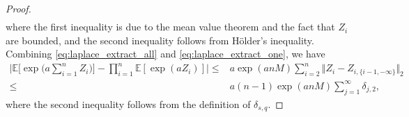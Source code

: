 \documentclass[11pt]{article}
\theoremstyle{plain}
\theoremstyle{definition}
\begin{document}
\begin{proof}
\begin{align}
\end{align} 
where the first inequality is due to the mean value theorem and the fact that $Z_i$ are bounded, and the second inequality follows from H\"older's inequality.
Combining \eqref{eq:laplace_extract_all} and \eqref{eq:laplace_extract_one}, we have
\begin{equation*}
\begin{aligned}
    \bigg|\mathbb{E}\Big[\exp\Big(a\sum_{i = 1}^n Z_i \Big) \Big] - \prod_{i = 1}^n \mathbb{E}[\exp(aZ_i)]\bigg| \leq& a\exp(anM)\sum_{i = 2}^n\big\Vert Z_i - Z_{i,\{i-1, -\infty\}}\big\Vert_2\\
    \leq& a(n-1)\exp(anM)\sum_{j = 1}^{\infty}\delta_{j,2},
\end{aligned}
\end{equation*}
where the second inequality follows from the definition of $\delta_{s,q}$.
\end{proof}
\end{document}
